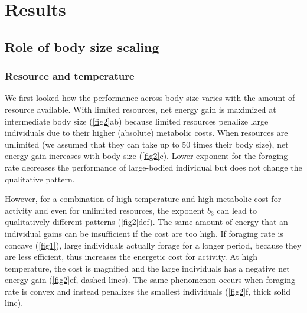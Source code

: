 \section*{Results}
\subsection*{Role of body size scaling}
\subsubsection*{Resource  and temperature}
We first looked how the performance across body size varies with the amount of resource available.
 With limited resources, net energy gain is maximized at intermediate body size (\cref{fig2}ab) because limited resources penalize large individuals due to their higher (absolute) metabolic costs. 
 When resources are unlimited (we assumed that they can take up to 50 times their body size), net energy gain increases with body size (\cref{fig2}c).
 Lower exponent for the foraging rate decreases the performance of large-bodied individual but does not change the qualitative pattern.

However, for a combination of high temperature and high metabolic cost for activity and even for unlimited resources, the exponent $b_3$ can lead to qualitatively different patterns (\cref{fig2}def).
The same amount of energy that an individual gains can be insufficient if the cost are too high.
If foraging rate is concave (\cref{fig1}), large individuals actually forage for a longer period, because they are less efficient, thus increases the energetic cost for activity.
At high temperature, the cost is magnified and the large individuals has a negative net energy gain (\cref{fig2}ef, dashed lines).
The same phenomenon occurs when foraging rate is convex and instead penalizes the smallest individuals (\cref{fig2}f, thick solid line).
